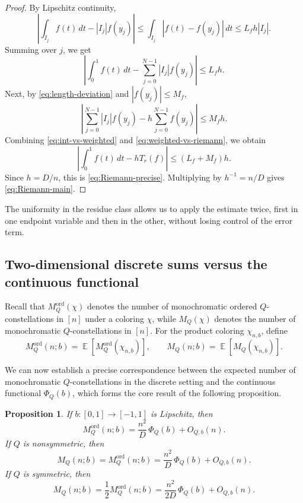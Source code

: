 \documentclass[twoside,12pt]{article}
\newcommand{\ord}{\mathrm{ord}}
\newcommand{\Mord}{M^{\ord}}
\DeclareMathOperator{\E}{\mathbb{E}}
\newcommand{\1}{\mathbf 1}
\newtheorem{proposition}{Proposition}[section]
\begin{document}
\begin{proof}
By Lipschitz continuity,
\[
\left|\int_{I_j}f(t)\,dt-|I_j|f(y_j)\right|
\le
\int_{I_j}|f(t)-f(y_j)|\,dt
\le
L_fh|I_j|.
\]
Summing over \(j\), we get
\begin{equation}\label{eq:int-vs-weighted}
\left|
\int_0^1 f(t)\,dt
-
\sum_{j=0}^{N-1}|I_j|f(y_j)
\right|
\le L_fh.
\end{equation}
Next, by \eqref{eq:length-deviation} and \(|f(y_j)|\le M_f\),
\begin{equation}\label{eq:weighted-vs-riemann}
\left|
\sum_{j=0}^{N-1}|I_j|f(y_j)
-
h\sum_{j=0}^{N-1}f(y_j)
\right|
\le M_fh.
\end{equation}
Combining \eqref{eq:int-vs-weighted} and \eqref{eq:weighted-vs-riemann}, we
obtain
\[
\left|\int_0^1 f(t)\,dt-hT_r(f)\right|
\le (L_f+M_f)h.
\]
Since \(h=D/n\), this is \eqref{eq:Riemann-precise}.  Multiplying by
\(h^{-1}=n/D\) gives \eqref{eq:Riemann-main}.
\end{proof}

The uniformity in the residue class allows us to apply the estimate twice,
first in one endpoint variable and then in the other, without losing control of
the error term.

\subsection{Two-dimensional discrete sums versus the continuous functional}

Recall that \(\Mord_Q(\chi)\) denotes the number of monochromatic ordered
\(Q\)-constellations in \([n]\) under a coloring \(\chi\), while
\(M_Q(\chi)\) denotes the number of monochromatic \(Q\)-constellations in
\([n]\).  For the product coloring \(\chi_{n,b}\), define
\[
\Mord_Q(n;b)=\E\!\left[\Mord_Q(\chi_{n,b})\right],
\qquad
M_Q(n;b)=\E\!\left[M_Q(\chi_{n,b})\right].
\]

We can now establish a precise correspondence between the expected number of monochromatic $Q$-constellations in the discrete setting and the continuous functional $\Phi_Q(b)$, which forms the core result of the following proposition.
\begin{proposition}\label{prop:transfer}
If \(b:[0,1]\to[-1,1]\) is Lipschitz, then
\begin{equation}\label{eq:transfer-ord}
\Mord_Q(n;b)=\frac{n^2}{D}\,\Phi_Q(b)+O_{Q,b}(n).
\end{equation}
If \(Q\) is nonsymmetric, then
\begin{equation}\label{eq:transfer-act-nonsym}
M_Q(n;b)=\Mord_Q(n;b)=\frac{n^2}{D}\,\Phi_Q(b)+O_{Q,b}(n).
\end{equation}
If \(Q\) is symmetric, then
\begin{equation}\label{eq:transfer-act-sym}
M_Q(n;b)=\frac12\Mord_Q(n;b)=\frac{n^2}{2D}\,\Phi_Q(b)+O_{Q,b}(n).
\end{equation}
\end{proposition}
\end{document}
